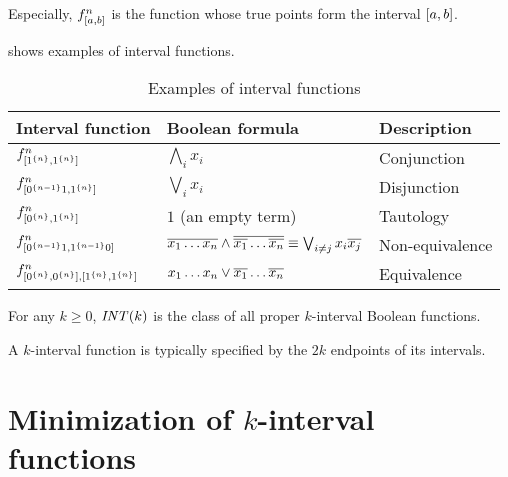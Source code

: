 

Especially,
$f^{n}_{[a, b]}$ is the function
whose true points form the interval $[a, b]$.

shows examples of interval functions.

\begin{table}[h]
\centering
\begin{tabular}{lll}
Interval function & Boolean formula & Description \\
\hline
$f^{n}_{[1^{\{n\}}, 1^{\{n\}}]}$ &
$\bigwedge_i{x_i}$ & Conjunction \\
$f^{n}_{[0^{\{n-1\}} 1, 1^{\{n\}}]}$ &
$\bigvee_i{x_i}$ & Disjunction \\
$f^{n}_{[0^{\{n\}}, 1^{\{n\}}]}$ &
$1$ (an empty term) & Tautology \\
$f^{n}_{[0^{\{n-1\}} 1, 1^{\{n-1\}} 0]}$ &
$\overline{x_1 \ldots x_n} \wedge
\overline{\overline{x_1} \ldots \overline{x_n}}
\equiv \bigvee_{i \neq j}{x_i \overline{x_j}}$ &
Non-equivalence \\
$f^n_{[0^{\{n\}}, 0^{\{n\}}],
[1^{\{n\}}, 1^{\{n\}}]}$ &
$x_1 \ldots x_n \vee \overline{x_1} \ldots \overline{x_n}$ &
Equivalence
\end{tabular}
\caption{Examples of interval functions}
\label{tab:exampleintfns}
\end{table}

\begin{definition}
[$\intervalfns{k}$]
\label{def:intervalfns}
For any $k \geq 0$,
$\intervalfns{k}$ is the class
of all proper $k$-interval Boolean functions.
\end{definition}

A $k$-interval function is typically specified
by the $2k$ endpoints of its intervals.
\section{Minimization of \texorpdfstring{$k$}{k}-interval functions}


